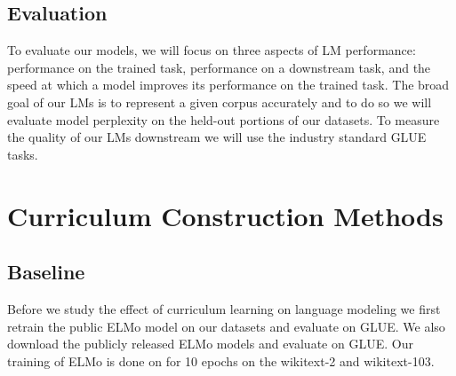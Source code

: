 \subsection{Evaluation}
To evaluate our models, we will focus on three aspects of LM performance: performance on the trained task, performance on a downstream task, and the speed at which a model improves its performance on the trained task. The broad goal of our LMs is to represent a given corpus accurately and to do so we will evaluate model perplexity on the held-out portions of our datasets.
To measure the quality of our LMs downstream we will use the industry standard GLUE tasks.
\section{Curriculum Construction Methods}
\label{chap:method:sec:cldevelopment}
\subsection{Baseline}
Before we study the effect of curriculum learning on language modeling we first retrain the public ELMo model on our datasets and evaluate on GLUE. We also download the publicly released ELMo models and evaluate on GLUE. Our training of ELMo is done on for 10 epochs on the wikitext-2 and wikitext-103.
